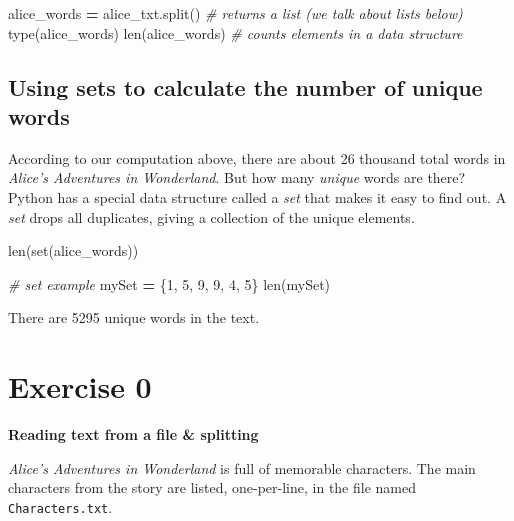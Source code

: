 \documentclass[]{book}
\newenvironment{Shaded}{\begin{snugshade}}{\end{snugshade}}
\newcommand{\BuiltInTok}[1]{#1}
\newcommand{\CommentTok}[1]{\textcolor[rgb]{0.56,0.35,0.01}{\textit{#1}}}
\newcommand{\DecValTok}[1]{\textcolor[rgb]{0.00,0.00,0.81}{#1}}
\newcommand{\NormalTok}[1]{#1}
\newcommand{\OperatorTok}[1]{\textcolor[rgb]{0.81,0.36,0.00}{\textbf{#1}}}
\begin{document}
\begin{Shaded}
\begin{Highlighting}[]
\NormalTok{alice_words }\OperatorTok{=}\NormalTok{ alice_txt.split() }\CommentTok{# returns a list (we talk about lists below)}
\BuiltInTok{type}\NormalTok{(alice_words)}
\BuiltInTok{len}\NormalTok{(alice_words) }\CommentTok{# counts elements in a data structure}
\end{Highlighting}
\end{Shaded}

\hypertarget{using-sets-to-calculate-the-number-of-unique-words}{%
\subsection{Using sets to calculate the number of unique words}\label{using-sets-to-calculate-the-number-of-unique-words}}

According to our computation above, there are about 26 thousand total words in \emph{Alice's Adventures in Wonderland}. But how many \emph{unique} words are there? Python has a special data structure called a \emph{set} that makes it easy to find out. A \emph{set} drops all duplicates, giving a collection of the unique elements.

\begin{Shaded}
\begin{Highlighting}[]
\BuiltInTok{len}\NormalTok{(}\BuiltInTok{set}\NormalTok{(alice_words))}

\CommentTok{# set example}
\NormalTok{mySet }\OperatorTok{=}\NormalTok{ \{}\DecValTok{1}\NormalTok{, }\DecValTok{5}\NormalTok{, }\DecValTok{9}\NormalTok{, }\DecValTok{9}\NormalTok{, }\DecValTok{4}\NormalTok{, }\DecValTok{5}\NormalTok{\}}
\BuiltInTok{len}\NormalTok{(mySet)}
\end{Highlighting}
\end{Shaded}

There are 5295 unique words in the text.

\hypertarget{exercise-0-3}{%
\section{Exercise 0}\label{exercise-0-3}}

\textbf{Reading text from a file \& splitting}

\emph{Alice's Adventures in Wonderland} is full of memorable characters. The main characters from the story are listed, one-per-line, in the file named \texttt{Characters.txt}.
\end{document}
